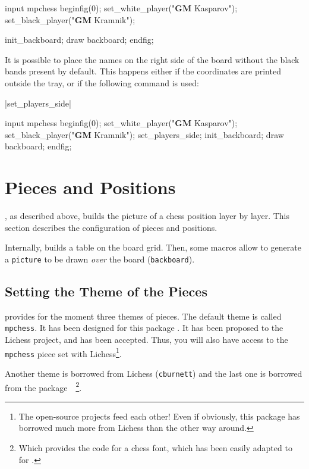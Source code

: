 \documentclass[english]{ltxdoc}
\begin{document}
\begin{ExempleMP}
input mpchess
beginfig(0);
set_white_player("\textbf{GM} Kasparov");
set_black_player("\textbf{GM} Kramnik");

init_backboard;
draw backboard;
endfig;
\end{ExempleMP}

It is possible to place the names on the right side of the board without the
black bands present by default. 
This happens either if the coordinates are printed outside the tray, or if the
following command is used:

\commande|set_players_side|\smallskip

\begin{ExempleMP}[righthand width=0.6\linewidth]
input mpchess
beginfig(0);
set_white_player("\textbf{GM} Kasparov");
set_black_player("\textbf{GM} Kramnik");
set_players_side;
init_backboard;
draw backboard;
endfig;
\end{ExempleMP}



\section{Pieces and Positions}

\mpchess, as described above, builds the picture of a chess position
layer by layer. This section describes the configuration of pieces and
positions.

Internally, \mpchess builds a table on the board grid. Then, some
macros allow to generate a \lstinline+picture+ to be drawn \emph{over} the board (\lstinline+backboard+).

\subsection{Setting the Theme of the Pieces}

\mpchess provides for the moment three themes of pieces. The default theme is
called \lstinline+mpchess+. It has been designed for this package .
It has been proposed to the Lichess project, and has been accepted. Thus, you
will also have access to the \lstinline+mpchess+ piece set with
Lichess\footnote{The open-source projects feed each other! Even if obviously,
this package has borrowed much more from Lichess than the other way around.}.

Another theme is borrowed from
Lichess (\lstinline+cburnett+) and the last one is borrowed from the
package~~\cite{ctan-skak}\footnote{Which provides the \MF{} code
for a chess font, which has been easily adapted to \MP{} for \mpchess.}.
\end{document}
